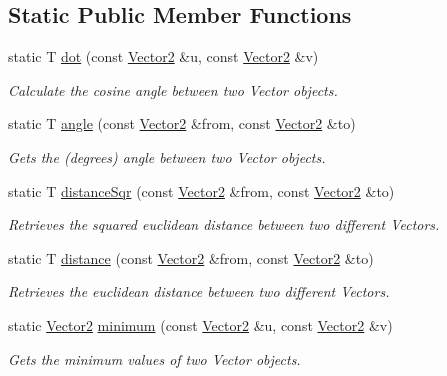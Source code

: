 \subsection*{Static Public Member Functions}
\begin{DoxyCompactItemize}
\item 
static T \hyperlink{classsparky_1_1_vector2_aaf94222514e04f14673540c1b5619ba1}{dot} (const \hyperlink{classsparky_1_1_vector2}{Vector2} \&u, const \hyperlink{classsparky_1_1_vector2}{Vector2} \&v)
\begin{DoxyCompactList}\small\item\em Calculate the cosine angle between two Vector objects. \end{DoxyCompactList}\item 
static T \hyperlink{classsparky_1_1_vector2_ae9b8e7806712b2e7a21090f5804af7e8}{angle} (const \hyperlink{classsparky_1_1_vector2}{Vector2} \&from, const \hyperlink{classsparky_1_1_vector2}{Vector2} \&to)
\begin{DoxyCompactList}\small\item\em Gets the (degrees) angle between two Vector objects. \end{DoxyCompactList}\item 
static T \hyperlink{classsparky_1_1_vector2_a993818c0e8558a001cdf44a876149776}{distance\+Sqr} (const \hyperlink{classsparky_1_1_vector2}{Vector2} \&from, const \hyperlink{classsparky_1_1_vector2}{Vector2} \&to)
\begin{DoxyCompactList}\small\item\em Retrieves the squared euclidean distance between two different Vectors. \end{DoxyCompactList}\item 
static T \hyperlink{classsparky_1_1_vector2_a128195f83e6ae893c2299ba3cd852956}{distance} (const \hyperlink{classsparky_1_1_vector2}{Vector2} \&from, const \hyperlink{classsparky_1_1_vector2}{Vector2} \&to)
\begin{DoxyCompactList}\small\item\em Retrieves the euclidean distance between two different Vectors. \end{DoxyCompactList}\item 
static \hyperlink{classsparky_1_1_vector2}{Vector2} \hyperlink{classsparky_1_1_vector2_ad97f9078398cfa49dd75280d5d3f40a2}{minimum} (const \hyperlink{classsparky_1_1_vector2}{Vector2} \&u, const \hyperlink{classsparky_1_1_vector2}{Vector2} \&v)
\begin{DoxyCompactList}\small\item\em Gets the minimum values of two Vector objects. \end{DoxyCompactList}\item 

\end{DoxyCompactItemize}
